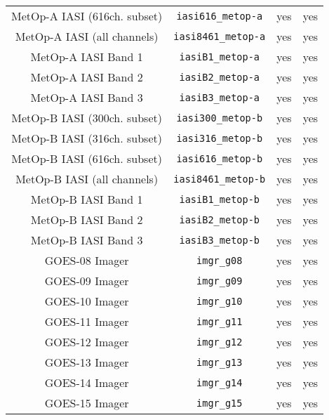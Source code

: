 \begin{center}
\begin{longtable}{c c c c}
  MetOp-A IASI (616ch. subset)       & \texttt{iasi616\_metop-a}    &  yes     &  yes       \\
  MetOp-A IASI (all channels)        & \texttt{iasi8461\_metop-a}   &  yes     &  yes       \\
  MetOp-A IASI Band 1                & \texttt{iasiB1\_metop-a}     &  yes     &  yes       \\
  MetOp-A IASI Band 2                & \texttt{iasiB2\_metop-a}     &  yes     &  yes       \\
  MetOp-A IASI Band 3                & \texttt{iasiB3\_metop-a}     &  yes     &  yes       \\
  MetOp-B IASI (300ch. subset)       & \texttt{iasi300\_metop-b}    &  yes     &  yes       \\
  MetOp-B IASI (316ch. subset)       & \texttt{iasi316\_metop-b}    &  yes     &  yes       \\
  MetOp-B IASI (616ch. subset)       & \texttt{iasi616\_metop-b}    &  yes     &  yes       \\
  MetOp-B IASI (all channels)        & \texttt{iasi8461\_metop-b}   &  yes     &  yes       \\
  MetOp-B IASI Band 1                & \texttt{iasiB1\_metop-b}     &  yes     &  yes       \\
  MetOp-B IASI Band 2                & \texttt{iasiB2\_metop-b}     &  yes     &  yes       \\
  MetOp-B IASI Band 3                & \texttt{iasiB3\_metop-b}     &  yes     &  yes       \\
  GOES-08 Imager                     & \texttt{imgr\_g08}           &  yes     &  yes       \\
  GOES-09 Imager                     & \texttt{imgr\_g09}           &  yes     &  yes       \\
  GOES-10 Imager                     & \texttt{imgr\_g10}           &  yes     &  yes       \\
  GOES-11 Imager                     & \texttt{imgr\_g11}           &  yes     &  yes       \\
  GOES-12 Imager                     & \texttt{imgr\_g12}           &  yes     &  yes       \\
  GOES-13 Imager                     & \texttt{imgr\_g13}           &  yes     &  yes       \\
  GOES-14 Imager                     & \texttt{imgr\_g14}           &  yes     &  yes       \\
  GOES-15 Imager                     & \texttt{imgr\_g15}           &  yes     &  yes       \\

\end{longtable}
\end{center}
